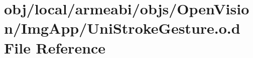 \hypertarget{objs_2_open_vision_2_img_app_2_uni_stroke_gesture_8o_8d}{\section{obj/local/armeabi/objs/\-Open\-Vision/\-Img\-App/\-Uni\-Stroke\-Gesture.o.\-d \-File \-Reference}
\label{objs_2_open_vision_2_img_app_2_uni_stroke_gesture_8o_8d}
}
